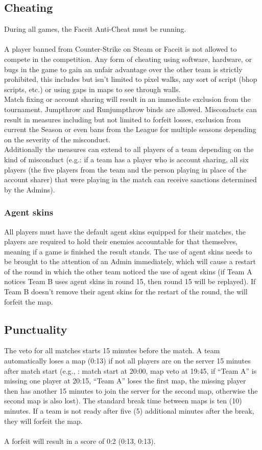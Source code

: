 \documentclass{article}
\newcommand{\TeamA}{{\color{red}Team A }}
\newcommand{\TeamB}{{\color{blue}Team B }}
\begin{document}
\subsection{Cheating}
During all games, the Faceit Anti-Cheat must be running.\\
\\
A player banned from Counter-Strike on Steam or Faceit is not allowed to compete in the competition.
Any form of cheating using software, hardware, or bugs in the game to gain an unfair advantage over the 
other team is strictly prohibited, this includes but isn't limited to pixel walks, any sort of script (bhop scripts, etc.) or
using gaps in maps to see through walls. \\
Match fixing or account sharing will result in an immediate exclusion from the tournament.
Jumpthrow and Runjumpthrow binds are allowed. Misconducts can result in measures including but not limited to forfeit losses, exclusion from current the Season or even bans from the League for multiple seasons depending on the severity of the misconduct. \\

\noindent
Additionally the measures can extend to all players of a team depending on the kind of misconduct (e.g.: if a team has a player 
who is account sharing, all six players (the five players from the team and the person playing in place of the account sharer)  
that were playing in the match can receive sanctions determined by the Admins).


\subsubsection{Agent skins}
All players must have the default agent skins equipped for their matches, the players are required to hold their enemies accountable for that themselves, meaning if a game is finished the result stands. The use of agent skins needs to be brought to 
the attention of an Admin immediately, which will cause a restart of the round in which the other team noticed the use of agent skins (if \TeamA notices \TeamB uses agent skins in round 15, then round 15 will be replayed). If \TeamB doesn't remove their agent skins for the restart of the round, the will forfeit the map.   


\subsection{Punctuality}
The veto for all matches starts 15 minutes before the match. A team automatically loses a map (0:13) if not all players are on the server 15 minutes after match start (e.g., : match start at 20:00, map veto at 19:45, if “Team A” is missing one player at 20:15, “Team A” loses the first map, the missing player then has another 15 minutes to join the server for the second map, otherwise the second map is also lost). The standard break time between maps is ten (10) minutes. If a team is not ready after five (5) additional minutes after the break, they will forfeit the map. \\
\\
A forfeit will result in a score of 0:2 (0:13, 0:13).
\end{document}
